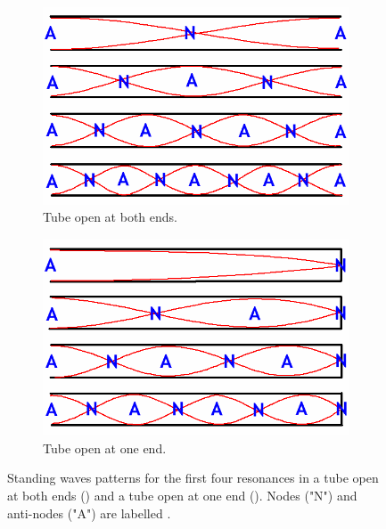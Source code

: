 \documentclass[12pt]{article}
\begin{document}
\begin{figure}[H]
    \centering
    \begin{subfigure}[b]{.45\textwidth}
        \centering
        \includegraphics[width=\linewidth]{open resonance.png}
        \caption{\centering Tube open at both ends.}
        \label{fig:1a}
    \end{subfigure}
    \hfill
    \begin{subfigure}[b]{.45\textwidth}
        \centering
        \includegraphics[width=\linewidth]{closed resonance.png}
        \caption{\centering Tube open at one end.}
        \label{fig:1b}
    \end{subfigure}
    \caption{Standing waves patterns for the first four resonances in a tube open at both ends () and a tube open at one end (). Nodes ("N") and anti-nodes ("A")
    are labelled \protect\cite{openclosedres}.}
    \label{fig:1}
\end{figure}
\end{document}
